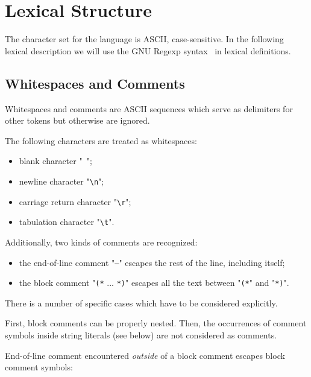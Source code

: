 
\section{Lexical Structure}
\label{sec:lexical_structure}

The character set for the language is \textsc{ASCII}, case-sensitive. In the following lexical description we will use
the GNU Regexp syntax~\cite{GNULib} in lexical definitions.

\subsection{Whitespaces and Comments}

Whitespaces and comments are \textsc{ASCII} sequences which serve as delimiters for other tokens but otherwise are
ignored.

The following characters are treated as whitespaces:

\begin{itemize}
\item blank character "\texttt{ }";
\item newline character "\texttt{\textbackslash n}";
\item carriage return character "\texttt{\textbackslash r}";
\item tabulation character "\texttt{\textbackslash t}".
\end{itemize}

Additionally, two kinds of comments are recognized:

\begin{itemize}
\item the end-of-line comment "\texttt{--}" escapes the rest of the line, including itself;
\item the block comment "\texttt{(*} ... \texttt{*)}" escapes all the text between
  "\texttt{(*}" and "\texttt{*)}".
\end{itemize}

There is a number of specific cases which have to be considered explicitly.

First, block comments can be properly nested. Then, the occurrences of comment symbols inside string literals (see below) are not
considered as comments.

End-of-line comment encountered \emph{outside} of a block comment escapes block comment symbols:

